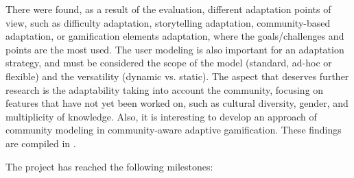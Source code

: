 \documentclass[sigconf]{acmart}
\begin{document}
There were found, as a result of the evaluation, different adaptation points of view, such as difficulty adaptation, storytelling adaptation, community-based adaptation, or gamification elements adaptation, where the goals/challenges and points are the most used. The user modeling is also important for an adaptation strategy, and must be considered the scope of the model (standard, ad-hoc or flexible) and the versatility (dynamic vs. static). The aspect that deserves further research is the adaptability taking into account the community, focusing on features that have not yet been worked on, such as cultural diversity, gender, and multiplicity of knowledge. Also, it is interesting to develop an approach of community modeling in community-aware adaptive gamification. These findings are compiled in  \cite{ayastuy_adaptive_2021}.


The project has reached the following milestones:
\end{document}
